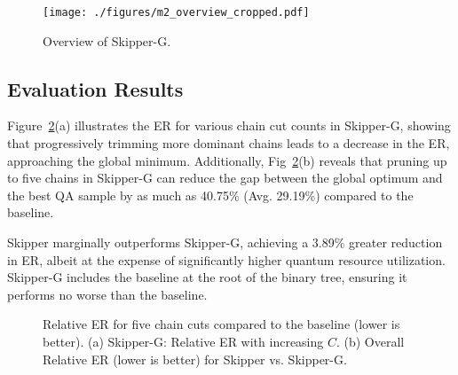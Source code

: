 \begin{figure}[t]
    \centering
    \texttt{[image: ./figures/m2\_overview\_cropped.pdf]}
    \caption{
Overview  of Skipper-G. 
}       
    \label{fig:m2_overview}
\end{figure}  

\subsection{Evaluation Results}

Figure~\ref{fig:DFS_fidelity}(a) illustrates the ER for various chain cut counts in Skipper-G, showing that progressively trimming more dominant chains leads to a decrease in the ER, approaching the global minimum. 
Additionally, Fig~\ref{fig:DFS_fidelity}(b) reveals that pruning up to five chains in Skipper-G can reduce the gap between the global optimum and the best QA sample by as much as 40.75\% (Avg. 29.19\%) compared to the baseline. 

Skipper marginally outperforms Skipper-G, achieving a 3.89\% greater reduction in ER, albeit at the expense of significantly higher quantum resource utilization. 
Skipper-G includes the baseline at the root of the binary tree, ensuring it performs no worse than the baseline.


\begin{figure}[h]
    \captionsetup[subfigure]{position=top} %
    \centering
    \caption{  
        Relative ER for five chain cuts compared to the baseline (lower is better). 
        (a) Skipper-G: Relative ER with increasing $C$. 
        (b) Overall Relative ER (lower is better) for Skipper vs. Skipper-G.
    }
    \label{fig:DFS_fidelity} 
\end{figure}  



